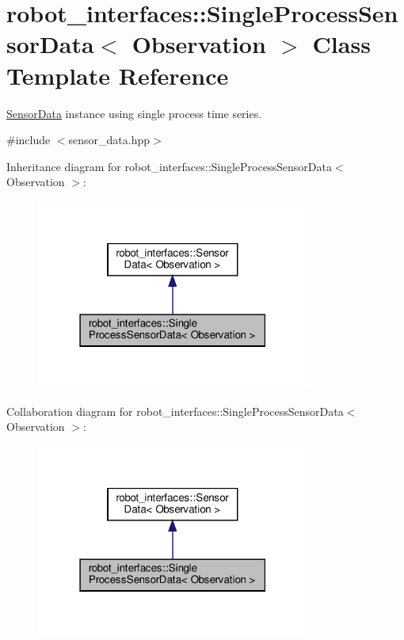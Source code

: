 \hypertarget{classrobot__interfaces_1_1SingleProcessSensorData}{}\section{robot\+\_\+interfaces\+:\+:Single\+Process\+Sensor\+Data$<$ Observation $>$ Class Template Reference}
\label{classrobot__interfaces_1_1SingleProcessSensorData}


\hyperlink{classrobot__interfaces_1_1SensorData}{Sensor\+Data} instance using single process time series.  




{\ttfamily \#include $<$sensor\+\_\+data.\+hpp$>$}



Inheritance diagram for robot\+\_\+interfaces\+:\+:Single\+Process\+Sensor\+Data$<$ Observation $>$\+:
\nopagebreak
\begin{figure}[H]
\begin{center}
\leavevmode
\includegraphics[width=255pt]{classrobot__interfaces_1_1SingleProcessSensorData__inherit__graph}
\end{center}
\end{figure}


Collaboration diagram for robot\+\_\+interfaces\+:\+:Single\+Process\+Sensor\+Data$<$ Observation $>$\+:
\nopagebreak
\begin{figure}[H]
\begin{center}
\leavevmode
\includegraphics[width=255pt]{classrobot__interfaces_1_1SingleProcessSensorData__coll__graph}
\end{center}
\end{figure}
